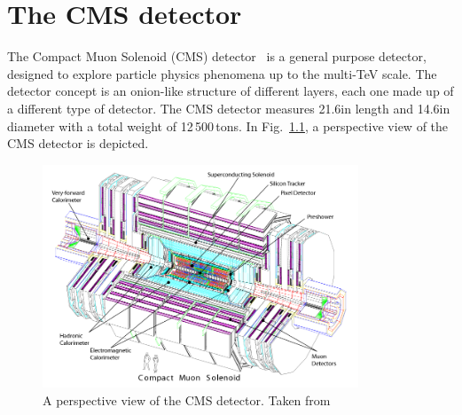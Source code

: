 \FloatBarrier
\chapter{The CMS detector}
The Compact Muon Solenoid (CMS) detector~\cite{bib:CMS:experiment,bib:CMS:TDR} is a general purpose detector, designed to explore particle physics phenomena up to the multi-TeV scale.
The detector concept is an onion-like structure of different layers, each one made up of a different type of detector. 
The CMS detector measures 21.6\m in length and 14.6\m in diameter with a total weight of 12\,500\,tons.
In Fig.~\ref{fig:CMSdetector}, a perspective view of the CMS detector is depicted. 
\begin{figure}[!b]
  \centering
      \includegraphics[width=0.84\textwidth]{figures/experiment/CMS/cms_complete_labelled.png}
  \caption{A perspective view of the CMS detector. Taken from~\cite{bib:CMS:experiment}}  
  \label{fig:CMSdetector}
\end{figure}

